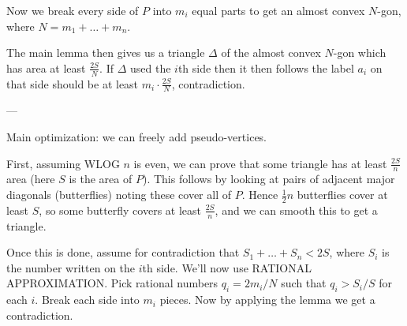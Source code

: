 Now we break every side of $P$ into $m_i$ equal parts
to get an almost convex $N$-gon, where $N = m_1 + \dots + m_n$.

The main lemma then gives us a triangle $\Delta$ of the almost convex $N$-gon
which has area at least $\frac{2S}{N}$.
If $\Delta$ used the $i$th side then it then follows the label $a_i$ on that side should be
at least $m_i \cdot \frac{2S}{N}$, contradiction.

---

Main optimization: we can freely add pseudo-vertices.

First, assuming WLOG $n$ is even, we can prove that some triangle has at least $\frac{2S}{n}$ area (here $S$ is the area of $P$).  This follows by looking at pairs of adjacent major diagonals (butterflies) noting these cover all of $P$.  Hence $\frac12 n$ butterflies cover at least $S$, so some butterfly covers at least $\frac{2S}{n}$, and we can smooth this to get a triangle.

Once this is done, assume for contradiction that $S_1 + \dots + S_n < 2S$, where $S_i$ is the number written on the $i$th side.  We'll now use RATIONAL APPROXIMATION. Pick rational numbers $q_i = 2m_i / N$ such that $q_i > S_i / S$ for each $i$.  Break each side into $m_i$ pieces.  Now by applying the lemma we get a contradiction.
